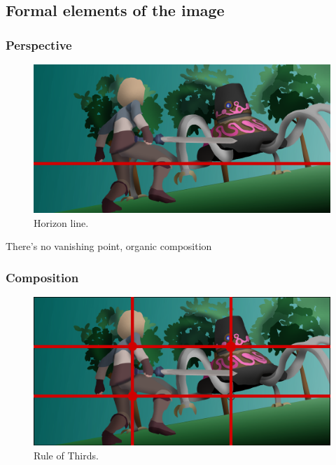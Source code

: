 \documentclass{cup-pan}
\begin{document}
\newpage
    \subsection{Formal elements of the image}
        
        \subsubsection{Perspective}

            \begin{figure}[H]
                \includegraphics[width=\textwidth]{Imagenes/Fanart2/Analysis/horizonte.png}
                \caption{Horizon line.}
            \end{figure}

            There's no vanishing point, organic composition

        \subsubsection{Composition}

            \begin{figure}[H]
                \includegraphics[width=\textwidth]{Imagenes/Fanart2/Analysis/Analysis.png}
                \caption{Rule of Thirds.}
            \end{figure}
\end{document}
